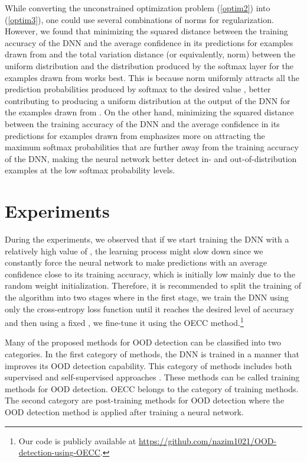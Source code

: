 \documentclass{article} \usepackage{iclr2020_conference,times}
\begin{document}
While converting the unconstrained optimization problem (\ref{optim2}) into (\ref{optim3}), one could use several combinations of norms for regularization. However, we found that minimizing the squared distance between the training accuracy of the DNN and the average confidence in its predictions for examples drawn from  and the total variation distance (or equivalently,  norm) between the uniform distribution and the distribution produced by the softmax layer for the examples drawn from  works best. This is because  norm uniformly attracts all the prediction probabilities produced by softmax to the desired value , better contributing to producing a uniform distribution at the output of the DNN for the examples drawn from . On the other hand, minimizing the squared distance between the training accuracy of the DNN and the average confidence in its predictions for examples drawn from  emphasizes more on attracting the maximum softmax probabilities that are further away from the training accuracy of the DNN, making the neural network better detect in- and out-of-distribution examples at the low softmax probability levels.  


\section{Experiments}
During the experiments, we observed that if we start training the DNN with a relatively high value of , the learning process might slow down since we constantly force the neural network to make predictions with an average confidence close to its training accuracy, which is initially low mainly due to the random weight initialization. Therefore, it is recommended to split the training of the algorithm into two stages where in the first stage, we train the DNN using only the cross-entropy loss function until it reaches the desired level of accuracy  and then using a fixed , we fine-tune it using the OECC method.\footnote{Our code is publicly available at \href{https://github.com/nazim1021/OOD-detection-using-OECC}{https://github.com/nazim1021/OOD-detection-using-OECC}.}

Many of the proposed methods for OOD detection can be classified into two categories. In the first category of methods, the DNN is trained in a manner that improves its OOD detection capability. This category of methods includes both supervised \citep{2017arXiv171109325L,hendrycks2019oe} and self-supervised approaches \citep{hendrycks2019using,mohseni2020}. These methods can be called training methods for OOD detection. OECC belongs to the category of training methods. The second category are post-training methods for OOD detection \citep{Lee:2018:SUF:3327757.3327819,ch2019detecting,2017arXiv170602690L, Zisselman_2020_CVPR} where the OOD detection method is applied after training a neural network.
\end{document}
